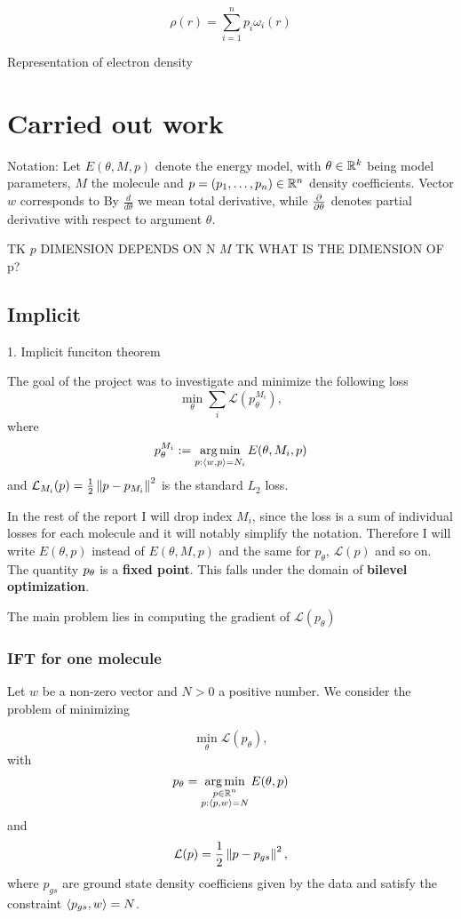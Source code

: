 \documentclass[a4paper,10pt]{report}
\begin{document}
\begin{equation}
 \rho(r) = \sum_{i=1}^n p_i \omega_i(r)
\end{equation}


Representation of electron density
\section{Carried out work}
Notation: Let $E(\theta, M ,p)$ denote the energy model, with $\theta \in \mathbb{R}^k$ being model parameters, $M$ the molecule and $p=(p_1, \ldots ,p_n )\in \mathbb{R}^n$ density coefficients. Vector $w$ corresponds to
By $\frac{d}{d\theta}$ we mean total derivative, while $\frac{\partial }{\partial \theta}$ denotes partial derivative with respect to argument $\theta$.

TK $p$ DIMENSION DEPENDS ON N $M$
TK WHAT IS THE DIMENSION OF p?

 \subsection{Implicit}
1. Implicit funciton theorem

The goal of the project was to investigate and minimize the following loss
\begin{equation}
 \min_\theta \sum_i \mathcal{L}(p_{\theta}^{M_i}),
\end{equation}
where
\begin{equation}
  p_\theta^{M_i}:=\operatorname*{arg\,min}_{p : \langle w, p \rangle=N_i} E(\theta,M_i,p)
\end{equation}
and $\mathcal{L}_{M_i}(p) = \frac{1}{2}\left\|p-p_{M_i}\right\|^2$ is the standard $L_2$ loss.

In the rest of the report I will drop index $M_i$, since the loss is a sum of individual losses for each molecule and it will notably simplify the notation.
Therefore I will write $E(\theta,p)$ instead of $E(\theta,M,p)$ and the same for $p_\theta$, $\mathcal{L}(p)$ and so on.
The quantity $p_\theta$ is a \textbf{fixed point}.
This falls under the domain of \textbf{bilevel optimization}.

The main problem lies in computing the gradient of $\mathcal{L}(p_\theta)$


\subsubsection{IFT for one molecule}
Let $w$ be a non-zero vector and $N>0$ a positive number.
We consider the problem of minimizing

\begin{equation}
 \min_\theta \mathcal{L}(p_\theta),
\end{equation}
with
\begin{equation}
p_\theta = \operatorname*{arg\,min}_{\substack{p \in \mathbb{R}^n \\ p: \langle p, w \rangle=N }} E(\theta, p)
\end{equation}
and
\begin{equation}
 \mathcal{L}(p) = \frac{1}{2} \left\|p-p_{gs}\right\|^2,
\end{equation}
where $p_{gs}$ are ground state density coefficiens given by the data and satisfy the constraint $\langle p_{gs}, w \rangle = N$.
\end{document}
